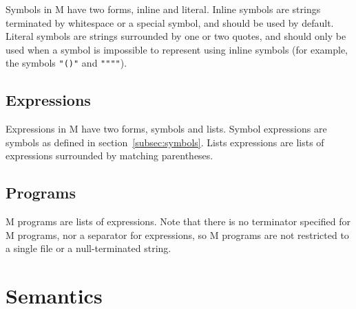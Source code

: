 \documentclass{article}
\begin{document}
\begin{multicols}{2}
        \begin{minipage}{\columnwidth}
            Symbols in M have two forms, inline and literal.
            Inline symbols are strings terminated by whitespace or a special symbol, and should be used by default.
            Literal symbols are strings surrounded by one or two quotes, and should only be used when a symbol is impossible to represent using inline symbols (for example, the symbols \texttt{"()"} and \texttt{""""}).
        \end{minipage}

        \subsection{Expressions}\label{subsec:expressions}

        \begin{minipage}{\columnwidth}
            Expressions in M have two forms, symbols and lists.
            Symbol expressions are symbols as defined in section~\ref{subsec:symbols}.
            Lists expressions are lists of expressions surrounded by matching parentheses.
        \end{minipage}

        \subsection{Programs}\label{subsec:programs}

        \begin{minipage}{\columnwidth}
            M programs are lists of expressions.
            Note that there is no terminator specified for M programs, nor a separator for expressions, so M programs are not restricted to a single file or a null-terminated string.
        \end{minipage}
    \end{multicols}
    \newpage

    \section{Semantics}\label{sec:semantics}
\end{document}
